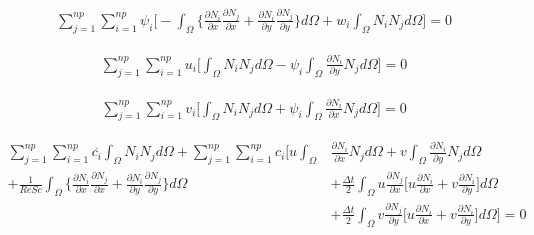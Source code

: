 \begin{equation}
 \begin{aligned}
  \sum\limits_{j=1}^{np}
  \sum\limits_{i=1}^{np} \psi_i \Bigg[
  - \int_{\Omega} \Bigg\{ 
                  \frac{\partial N_i}{\partial x} 
                  \frac{\partial N_j}{\partial x} 
  +               \frac{\partial N_i}{\partial y} 
                  \frac{\partial N_j}{\partial y} 
  \Bigg\} d\Omega
  + w_i \int_{\Omega} N_i N_j d\Omega
  \Bigg] = 0
 \end{aligned}
\end{equation}

\begin{equation}
 \begin{aligned}
  \sum\limits_{j=1}^{np}
  \sum\limits_{i=1}^{np} u_i \Bigg[
   \int_{\Omega} N_i N_j d\Omega
 - \psi_i \int_{\Omega} \frac{\partial N_i}{\partial y} N_j d\Omega
  \Bigg] = 0
 \end{aligned}
\end{equation}

\begin{equation}
 \begin{aligned}
  \sum\limits_{j=1}^{np}
  \sum\limits_{i=1}^{np} v_i \Bigg[
   \int_{\Omega} N_i N_j d\Omega
 + \psi_i \int_{\Omega} \frac{\partial N_i}{\partial x} N_j d\Omega
  \Bigg] = 0
 \end{aligned}
\end{equation}

\begin{equation}
 \begin{aligned} 
  \sum\limits_{j=1}^{np}
  \sum\limits_{i=1}^{np} \overset{.}{c_i} \int_{\Omega} N_i N_j d\Omega 
  + \sum\limits_{j=1}^{np}
    \sum\limits_{i=1}^{np} c_i \Bigg[
    u \int_{\Omega} & \frac{\partial N_i}{\partial x} N_j d\Omega 
  + v \int_{\Omega} \frac{\partial N_i}{\partial y} N_j d\Omega
  \\[5pt]
  + \frac{1}{\textit{ReSc}} \int_{\Omega} \Bigg\{ 
                    \frac{\partial N_i}{\partial x} 
                    \frac{\partial N_j}{\partial x} 
  +                 \frac{\partial N_i}{\partial y} 
                    \frac{\partial N_j}{\partial y} 
  \Bigg\} d\Omega 
 & + \frac{\Delta t}{2} \int_{\Omega} u \frac{\partial N_j}{\partial x}
 \Bigg[
   u \frac{\partial N_i}{\partial x}
 + v \frac{\partial N_i}{\partial y}
 \Bigg] d\Omega
 \\[5pt]
 & + \frac{\Delta t}{2} \int_{\Omega} v \frac{\partial N_j}{\partial y}
 \Bigg[
   u \frac{\partial N_i}{\partial x}
 + v \frac{\partial N_i}{\partial y}
 \Bigg] d\Omega
 \Bigg] = 0
 \end{aligned}
\end{equation}

